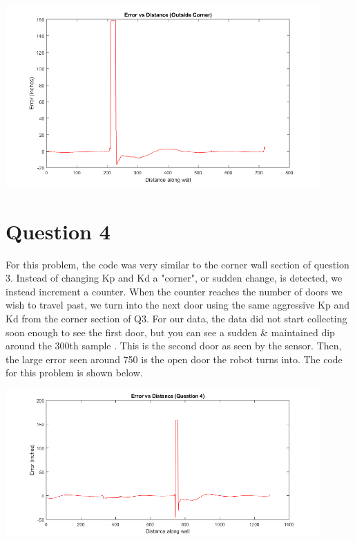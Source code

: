 \documentclass{article}
\begin{document}
	
	
	{\centering
	\includegraphics[width=0.9\textwidth]{CornerErr}\par
	}
	
	\section*{Question 4}
	
	For this problem, the code was very similar to the corner wall section of question 3. Instead of changing Kp and Kd a "corner", or sudden change, is detected, we instead increment a counter. When the counter reaches the number of doors we wish to travel past, we turn into the next door using the same aggressive Kp and Kd from the corner section of Q3. For our data, the data did not start collecting soon enough to see the first door, but you can see a sudden \& maintained dip around the 300th sample	. This is the second door as seen by the sensor. Then, the large error seen around 750 is the open door the robot turns into. The code for this problem is shown below.
	
	
	
	{\centering
	\includegraphics[width=0.9\textwidth]{DoorErr}\par
	}
	
\end{document}
